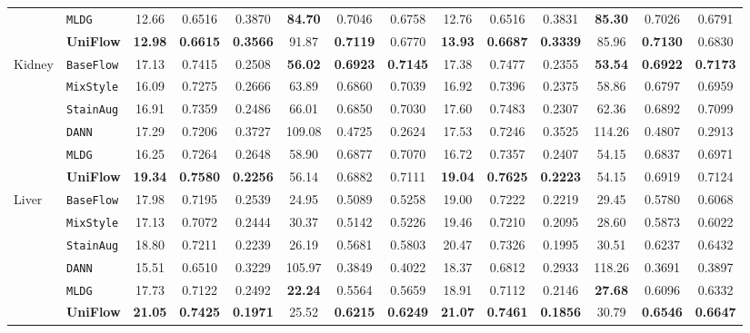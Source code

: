 \documentclass[journal]{IEEEtran}
\newcommand{\methodname}{UniFlow}
\begin{document}
\begin{table}[!t]
{\begin{tabular}{ll|cccccc|cccccc}
& \texttt{MLDG} & 12.66 & 0.6516 & 0.3870 & \textbf{84.70} & 0.7046 & 0.6758 & 12.76 & 0.6516 & 0.3831 & \textbf{85.30} & 0.7026 & 0.6791 \\
& \textbf{\methodname{}} & \textbf{12.98} & \textbf{0.6615} & \textbf{0.3566} & 91.87 & \textbf{0.7119} & 0.6770 & \textbf{13.93} & \textbf{0.6687} & \textbf{0.3339} & 85.96 & \textbf{0.7130} & 0.6830 \\
\midrule
\multirow{6}{*}{Kidney}
& \texttt{BaseFlow} & 17.13 & 0.7415 & 0.2508 & \textbf{56.02} & \textbf{0.6923} & \textbf{0.7145} & 17.38 & 0.7477 & 0.2355 & \textbf{53.54} & \textbf{0.6922} & \textbf{0.7173} \\
& \texttt{MixStyle} & 16.09 & 0.7275 & 0.2666 & 63.89 & 0.6860 & 0.7039 & 16.92 & 0.7396 & 0.2375 & 58.86 & 0.6797 & 0.6959 \\
& \texttt{StainAug} & 16.91 & 0.7359 & 0.2486 & 66.01 & 0.6850 & 0.7030 & 17.60 & 0.7483 & 0.2307 & 62.36 & 0.6892 & 0.7099 \\
& \texttt{DANN} & 17.29 & 0.7206 & 0.3727 & 109.08 & 0.4725 & 0.2624 & 17.53 & 0.7246 & 0.3525 & 114.26 & 0.4807 & 0.2913 \\
& \texttt{MLDG} & 16.25 & 0.7264 & 0.2648 & 58.90 & 0.6877 & 0.7070 & 16.72 & 0.7357 & 0.2407 & 54.15 & 0.6837 & 0.6971 \\
& \textbf{\methodname{}} & \textbf{19.34} & \textbf{0.7580} & \textbf{0.2256} & 56.14 & 0.6882 & 0.7111 & \textbf{19.04} & \textbf{0.7625} & \textbf{0.2223} & 54.15 & 0.6919 & 0.7124 \\
\midrule
\multirow{6}{*}{Liver}
& \texttt{BaseFlow} & 17.98 & 0.7195 & 0.2539 & 24.95 & 0.5089 & 0.5258 & 19.00 & 0.7222 & 0.2219 & 29.45 & 0.5780 & 0.6068 \\
& \texttt{MixStyle} & 17.13 & 0.7072 & 0.2444 & 30.37 & 0.5142 & 0.5226 & 19.46 & 0.7210 & 0.2095 & 28.60 & 0.5873 & 0.6022 \\
& \texttt{StainAug} & 18.80 & 0.7211 & 0.2239 & 26.19 & 0.5681 & 0.5803 & 20.47 & 0.7326 & 0.1995 & 30.51 & 0.6237 & 0.6432 \\
& \texttt{DANN} & 15.51 & 0.6510 & 0.3229 & 105.97 & 0.3849 & 0.4022 & 18.37 & 0.6812 & 0.2933 & 118.26 & 0.3691 & 0.3897 \\
& \texttt{MLDG} & 17.73 & 0.7122 & 0.2492 & \textbf{22.24} & 0.5564 & 0.5659 & 18.91 & 0.7112 & 0.2146 & \textbf{27.68} & 0.6096 & 0.6332 \\
& \textbf{\methodname{}} & \textbf{21.05} & \textbf{0.7425} & \textbf{0.1971} & 25.52 & \textbf{0.6215} & \textbf{0.6249} & \textbf{21.07} & \textbf{0.7461} & \textbf{0.1856} & 30.79 & \textbf{0.6546} & \textbf{0.6647} \\
\bottomrule
\end{tabular}}


\end{table}
\end{document}
